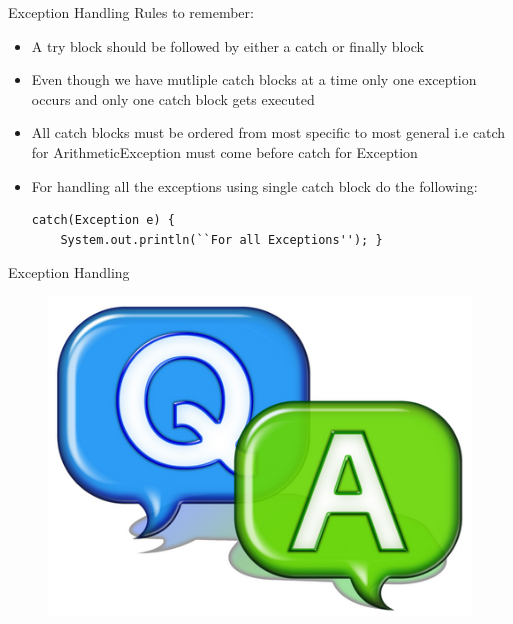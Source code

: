 \documentclass[14pt]{beamer}
\begin{document}
\begin{frame}[fragile]{Exception Handling}
 Rules to remember:
 \begin{itemize}
  \item A try block should be followed by either a catch or finally block
  \item Even though we have mutliple catch blocks at a time only one exception occurs and only one catch block gets executed
  \item All catch blocks must be ordered from most specific to most general i.e catch for ArithmeticException must come before catch for Exception
  \item For handling all the exceptions using single catch block do the following:
  \begin{lstlisting}[numbers=none, basicstyle=\tiny]
catch(Exception e) {
    System.out.println(``For all Exceptions''); } 
\end{lstlisting}
\end{itemize}
\end{frame}


\begin{frame}{Exception Handling}
 \begin{figure}[H]
 \begin{center}
 \includegraphics[scale=.3]{qa.png}  
 \end{center}
 \end{figure}
\end{frame}
\end{document}
